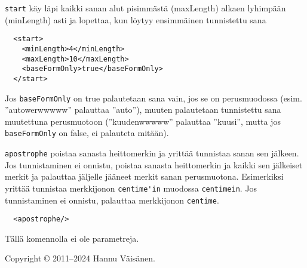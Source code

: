 \documentclass[12pt]{article}
\begin{document}


\bigskip
\verb=start= käy läpi kaikki sanan alut pisimmästä (maxLength) alkaen
lyhimpään (minLength) asti ja lopettaa, kun löytyy ensimmäinen
tunnistettu sana

\begin{verbatim}
  <start>
    <minLength>4</minLength>
    <maxLength>10</maxLength>
    <baseFormOnly>true</baseFormOnly>
  </start>
\end{verbatim}

Jos \verb=baseFormOnly= on true palautetaan sana vain, jos se on
perusmuodossa (esim. ''autowerwwwww'' palauttaa ''auto''), muuten
palautetaan tunnistettu sana muutettuna perusmuotoon (''kuudenwwwww''
palauttaa ''kuusi'', mutta jos \verb=baseFormOnly= on false, ei
palauteta mitään).




\bigskip

\verb=apostrophe= poistaa sanasta heittomerkin ja yrittää tunnistaa
sanan sen jälkeen. Jos tunnistaminen ei onnistu, poistaa sanasta
heittomerkin ja kaikki sen jälkeiset merkit ja palauttaa jäljelle
jääneet merkit sanan perusmuotona. Esimerkiksi yrittää tunnistaa
merkkijonon \verb=centime'in= muodossa \verb=centimein=. Jos
tunnistaminen ei onnistu, palauttaa merkkijonon \verb=centime=.


\begin{verbatim}
  <apostrophe/>
\end{verbatim}

Tällä komennolla ei ole parametreja.


\bigskip \noindent
Copyright © 2011--2024 Hannu Väisänen.
\end{document}
